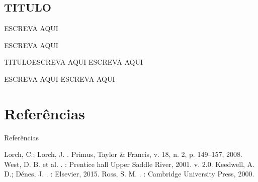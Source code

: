 \documentclass[xcolor=dvipsnames,table]{beamer}
\begin{document}

\subsection{TITULO}{ESCREVA AQUI}
	\begin{frame}{ESCREVA AQUI}
		
		\begin{block}{TITULO}{ESCREVA AQUI}
			ESCREVA AQUI
		\end{block}
		\begin{alertblock}{ESCREVA AQUI} 
			ESCREVA AQUI
		\end{alertblock}
	\end{frame}

	
\section{Referências}
	\begin{frame}[allowframebreaks]{Referências}
		\begin{thebibliography}{}
			\beamertemplatearticlebibitems
			 Lorch, C.; Lorch, J.
			. \newblock Primus, Taylor \& Francis, v. 18, n. 2, p. 149–157, 2008.
			\beamertemplatebookbibitems
			 West, D. B. et al.
			. \newblock [S.l.]: Prentice hall Upper Saddle River,
			2001. v. 2.0.
			\beamertemplatebookbibitems
			 Keedwell, A. D.; Dénes, J.
			. \newblock [S.l.]: Elsevier, 2015.
			\beamertemplatebookbibitems
			 Ross, S. M.
			. \newblock [S.l.]: Cambridge University Press, 2000.
		\end{thebibliography}
	\end{frame}

	
\end{document}
